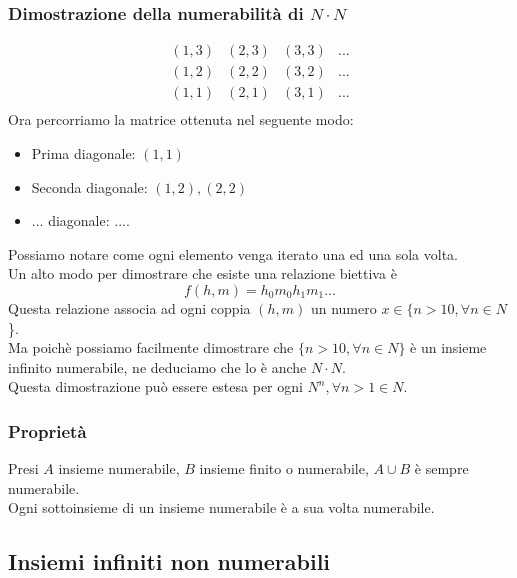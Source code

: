 \documentclass{report}
\begin{document}
        \subsubsection{Dimostrazione della numerabilità di $N \cdot N$}
            $$\begin{matrix}
                \left(1, 3\right) & \left(2, 3\right) & \left(3, 3\right) & ... \\
                \left(1, 2\right) & \left(2, 2\right) & \left(3, 2\right) & ... \\
                \left(1, 1\right) & \left(2, 1\right) & \left(3, 1\right) & ... \\
            \end{matrix}$$ 
            Ora percorriamo la matrice ottenuta nel seguente modo:
            \begin{itemize}
                \item Prima diagonale: $\left(1, 1\right)$
                \item Seconda diagonale: $\left(1, 2\right), \left(2, 2\right)$
                \item ... diagonale: ....
            \end{itemize}
            Possiamo notare come ogni elemento venga iterato una ed una sola volta. \\
            Un alto modo per dimostrare che esiste una relazione biettiva è 
            $$f\left(h, m\right) = h_0m_0h_1m_1...$$
            Questa relazione associa ad ogni coppia $\left(h,m\right)$ un numero $x \in \{n > 10, \forall n \in N$\}. \\
            Ma poichè possiamo facilmente dimostrare che $\{n > 10, \forall n \in N\}$ è un insieme infinito numerabile,
            ne deduciamo che lo è anche $N \cdot N$. \\
            Questa dimostrazione può essere estesa per ogni $N^n, \forall n > 1 \in N$.
        \subsubsection{Proprietà}
            Presi $A$ insieme numerabile, $B$ insieme finito o numerabile, $A \cup B$ è sempre
            numerabile. \\
            Ogni sottoinsieme di un insieme numerabile è a sua volta numerabile.
    \subsection{Insiemi infiniti non numerabili}
\end{document}

